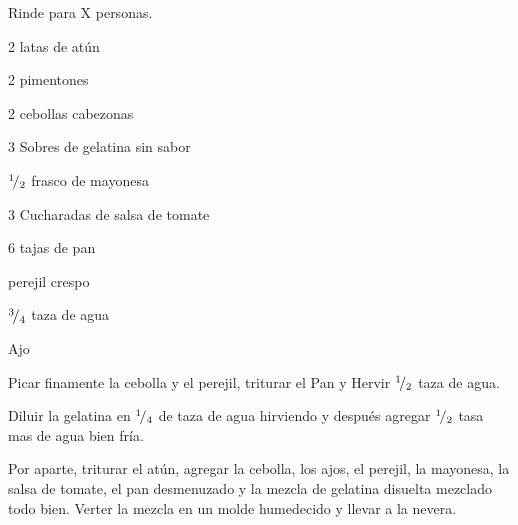
Rinde para X personas.


\begin{ingredientes}
\item 2 latas de atún
\item 2 pimentones
\item 2 cebollas cabezonas
\item 3 Sobres de gelatina sin sabor
\item ${}^{1}\!/_{2}$ frasco de mayonesa
\item 3 Cucharadas de salsa de tomate
\item 6 tajas de pan
\item perejil crespo
\item ${}^{3}\!/_{4}$ taza de agua
\item Ajo
\end{ingredientes}

\preparacion


Picar finamente la cebolla y el perejil, triturar el Pan y  Hervir ${}^{1}\!/_{2}$ taza de agua.

Diluir la gelatina en ${}^{1}\!/_{4}$ de taza de agua hirviendo y después agregar ${}^{1}\!/_{2}$ tasa mas de agua bien fría.

Por aparte, triturar el atún, agregar la cebolla, los ajos, el perejil, la mayonesa, la salsa de tomate, el pan desmenuzado y la mezcla de gelatina disuelta mezclado todo bien. Verter la mezcla en un molde humedecido y llevar a la nevera.
